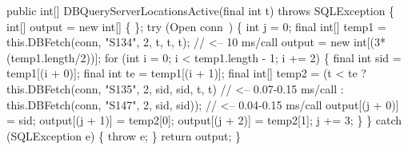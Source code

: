 \documentclass{article}
\def\nwendcode{\endtrivlist \endgroup}      %
\let\nwdocspar=\par
\theoremstyle{definition}                   %
\begin{document}
public int[] DBQueryServerLocationsActive(final int t) throws SQLException \{
  int[] output = new int[] \{ \};
  try (\LA{}Open \code{}conn\edoc{}~{\nwtagstyle{}}\RA{}) \{
    int j = 0;
\eatline
{}\nwendcode{}
\nwenddocs{}\plusendmoddef
    final int[] temp1 = this.DBFetch(conn, "S134", 2, t, t, t);  // <-- 10 ms/call
    output = new int[(3*(temp1.length/2))];
    for (int i = 0; i < temp1.length - 1; i += 2) \{
      final int sid = temp1[(i + 0)];
      final int  te = temp1[(i + 1)];
      final int[] temp2 = (t < te
        ? this.DBFetch(conn, "S135", 2, sid, sid, t, t)  // <-- 0.07-0.15 ms/call
        : this.DBFetch(conn, "S147", 2, sid, sid));      // <-- 0.04-0.15 ms/call
      output[(j + 0)] = sid;
      output[(j + 1)] = temp2[0];
      output[(j + 2)] = temp2[1];
      j += 3;
    \}
  \} catch (SQLException e) \{
    throw e;
  \}
  return output;
\}
\nwendcode{}\nwdocspar
\end{document}
